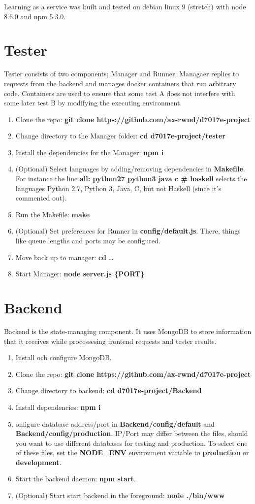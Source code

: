 Learning as a service was built and tested on debian linux 9 (stretch) with node 8.6.0 and npm 5.3.0.
\section{Tester}
Tester consists of two components; Manager and Runner. Managaer replies to requests from the backend and manages docker containers that run arbitrary code. Containers are used to ensure that some test A does not interfere with some later test B by modifying the executing environment.\\
\begin{enumerate}
    \item Clone the repo: \textbf{git clone https://github.com/ax-rwnd/d7017e-project}
    \item Change directory to the Manager folder: \textbf{cd d7017e-project/tester}
    \item Install the dependencies for the Manager: \textbf{npm i}
    \item (Optional) Select languages by adding/removing dependencies in \textbf{Makefile}. For instance the line\textbf{ all: python27 python3 java c \# haskell} selects the languages Python 2.7, Python 3, Java, C, but not Haskell (since it's commented out).
    \item Run the Makefile: \textbf{make}
    \item (Optional) Set preferences for Runner in \textbf{config/default.js}. There, things like queue lengths and ports may be configured.
    \item Move back up to manager: \textbf{cd ..}
    \item Start Manager: \textbf{node server.js \{PORT\}}
\end{enumerate}

\section{Backend}
Backend is the state-managing component. It uses MongoDB to store information that it receives while processesing frontend requests and tester results.
\begin{enumerate}
\item Install och configure MongoDB.
\item Clone the repo: \textbf{git clone https://github.com/ax-rwnd/d7017e-project}
\item Change directory to backend: \textbf{cd d7017e-project/Backend}
\item Install dependencies: \textbf{npm i}
\item onfigure database address/port in \textbf{Backend/config/default} and \textbf{Backend/config/production}. IP/Port may differ between the files, should you want to use different databases for testing and production. To select one of these files, set the \textbf{NODE\_ENV} environment variable to \textbf{production} or \textbf{development}.
\item Start the backend daemon: \textbf{npm start}.
\item (Optional) Start start backend in the foreground: \textbf{node ./bin/www}
\end{enumerate}

